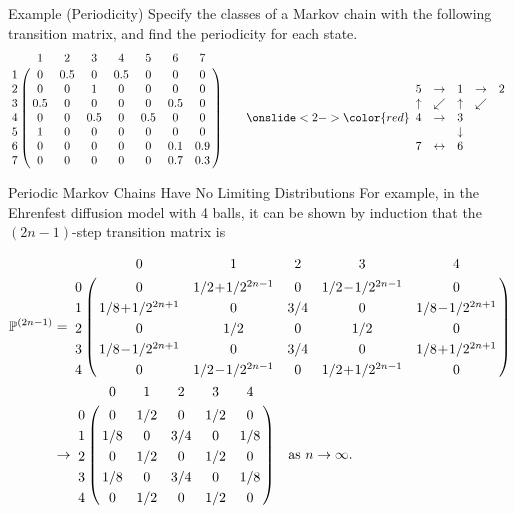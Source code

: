 \documentclass[letterpaper,handout]{beamer}
\def\P{\mathbb{P}}
\begin{document}
\begin{frame}{Example (Periodicity)}
Specify the classes of a Markov chain
with the following transition matrix, and find the periodicity for each state. \[
\bordermatrix{%
  &  1  &  2  &  3  &  4  &  5  &  6  &  7 \cr
1 &  0  & 0.5 &  0  & 0.5 &  0  &  0  &  0 \cr
2 &  0  &  0  &  1  &  0  &  0  &  0  &  0 \cr
3 & 0.5 &  0  &  0  &  0  &  0  & 0.5 &  0 \cr
4 &  0  &  0  & 0.5 &  0  & 0.5 &  0  &  0 \cr
5 &  1  &  0  &  0  &  0  &  0  &  0  &  0 \cr
6 &  0  &  0  &  0  &  0  &  0  & 0.1 & 0.9\cr
7 &  0  &  0  &  0  &  0  &  0  & 0.7 & 0.3
}
\qquad
\onslide<2->{{\color{red}
\begin{array}{ccccc}
5        & \to      & 1        & \to      & 2\\
\uparrow & \swarrow & \uparrow & \swarrow &  \\
4        & \to      & 3        & &\\
         &          & \downarrow &&\\
7 &\leftrightarrow & 6 &&\\
\end{array}}
}
\]
\end{frame}
\begin{frame}{Periodic Markov Chains Have No Limiting Distributions}
For example, in the Ehrenfest diffusion model with 4 balls,
it can be shown by induction that the $(2n-1)$-step transition matrix is
{\footnotesize
\begin{align*}
\P^{(2n-1)}&=
\bordermatrix{%
  &  0  &  1  &  2  &  3  &  4 \cr
0 &  0  & 1/2\!+\!1/2^{2n-1} &  0  & 1/2\!-\!1/2^{2n-1} &  0 \cr
1 & 1/8\!+\!1/2^{2n+1} &  0  & 3/4 &  0  & 1/8\!-\!1/2^{2n+1}\cr
2 &  0  & 1/2 &  0  & 1/2 & 0 \cr
3 & 1/8\!-\!1/2^{2n+1} &  0  & 3/4 &  0  & 1/8\!+\!1/2^{2n+1}\cr
4 &  0  & 1/2\!-\!1/2^{2n-1} &  0  & 1/2\!+\!1/2^{2n-1} &  0
}\\
&\to
\bordermatrix{%
  &  0  &  1  &  2  &  3  &  4 \cr
0 &  0  & 1/2 &  0  & 1/2 &  0 \cr
1 & 1/8 &  0  & 3/4 &  0  & 1/8\cr
2 &  0  & 1/2 &  0  & 1/2 & 0 \cr
3 & 1/8 &  0  & 3/4 &  0  & 1/8\cr
4 &  0  & 1/2 &  0  & 1/2 &  0
}\quad\text{as }n\to\infty.
\end{align*}

}
\end{frame}
\end{document}
